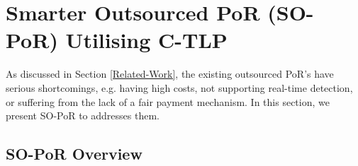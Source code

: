 

\vspace{-7mm}

\section{Smarter Outsourced PoR (SO-PoR) Utilising C-TLP}
 As discussed in Section \ref{Related-Work}, the existing outsourced PoR's  have serious shortcomings, e.g. having high costs, not supporting real-time detection, or suffering from the lack of a fair payment mechanism. In this section, we present SO-PoR to addresses them. 
 
 

 \vspace{-3mm}
 
\subsection{SO-PoR Overview} 


